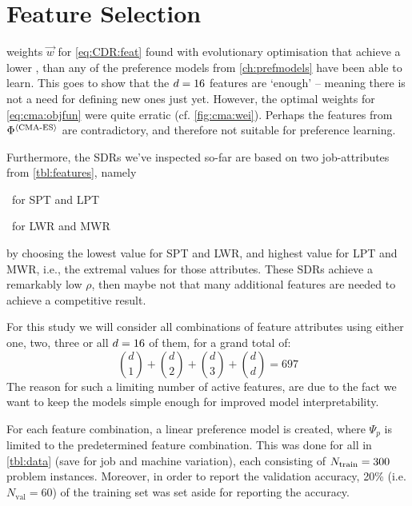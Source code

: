 
\chapter{Feature Selection}\label{ch:featselect}

 weights $\vec{w}$ 
for \cref{eq:CDR:feat} found with evolutionary optimisation that achieve a 
lower \namerho, than any of the preference models from \cref{ch:prefmodels}
have been able to learn. 
This goes to show that the $d=16$ features are `enough' -- 
meaning there is not a need for defining new ones just yet. 
However, the optimal weights for \cref{eq:cma:objfun} were quite erratic (cf. 
\cref{fig:cma:wei}). 
Perhaps the features from $\Phi^{\langle \text{CMA-ES} \rangle}$ are 
contradictory, and therefore not suitable for preference learning. 

Furthermore, the SDRs we've inspected so-far are based on two job-attributes 
from \cref{tbl:features}, namely
\begin{enumerate*}[after={{,}}]
  \item \phiproc\ for SPT and LPT 
  \item \phijobWrm\ for LWR and MWR 
\end{enumerate*}
by choosing the lowest value for SPT and LWR, and highest value for LPT and 
MWR, i.e., the extremal values for those attributes. 
These SDRs achieve a remarkably low $\rho$, then maybe not that many additional 
features are needed to achieve a competitive result.

For this study we will consider all combinations of 
feature attributes using either one, two, three or all $d=16$ of 
them, for a grand total of:
\begin{equation}\label{eq:697}
{d \choose 1}+{d \choose 2}+{d \choose 3}+{d \choose d} = 697
\end{equation}
The reason for such a limiting number of active features, are due to the fact 
we want to keep the models simple enough for improved model interpretability.

For each feature combination, a linear preference model is created, where 
$\Psi_p$ is limited to the predetermined feature combination. 
This was done for all \Problem[10\times10]{\train} in \cref{tbl:data} (save for 
job and machine variation), 
each consisting of $N_{\text{train}}=300$ problem instances.
Moreover, in order to report the validation accuracy, 20\% 
(i.e. $N_{\text{val}}=60$) of the training set was set aside for 
reporting the accuracy.

